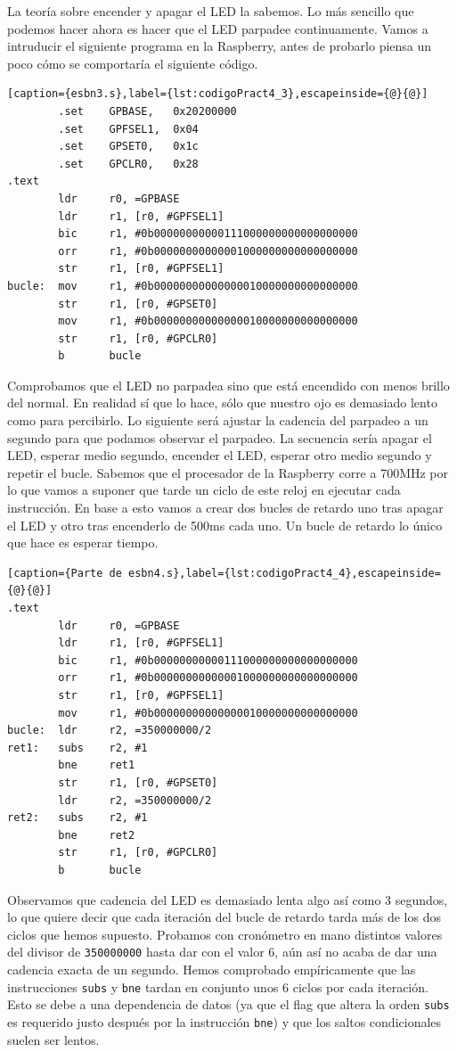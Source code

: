 La teoría sobre encender y apagar el LED la sabemos. Lo más sencillo que podemos hacer ahora
es hacer que el LED parpadee continuamente. Vamos a intruducir el siguiente programa en la
Raspberry, antes de probarlo piensa un poco cómo se comportaría el siguiente código.

\begin{lstlisting}[caption={esbn3.s},label={lst:codigoPract4_3},escapeinside={@}{@}]
        .set    GPBASE,   0x20200000
        .set    GPFSEL1,  0x04
        .set    GPSET0,   0x1c
        .set    GPCLR0,   0x28
.text
        ldr     r0, =GPBASE
        ldr     r1, [r0, #GPFSEL1]
        bic     r1, #0b00000000000111000000000000000000
        orr     r1, #0b00000000000001000000000000000000
        str     r1, [r0, #GPFSEL1]
bucle:  mov     r1, #0b00000000000000010000000000000000
        str     r1, [r0, #GPSET0]
        mov     r1, #0b00000000000000010000000000000000
        str     r1, [r0, #GPCLR0]
        b       bucle
\end{lstlisting}

Comprobamos que el LED no parpadea sino que está encendido con menos brillo del normal.
En realidad sí que lo hace, sólo que nuestro ojo es demasiado lento como para percibirlo.
Lo siguiente será ajustar la cadencia del parpadeo a un segundo para que podamos observar
el parpadeo. La secuencia sería apagar el LED, esperar medio segundo, encender el LED,
esperar otro medio segundo y repetir el bucle. Sabemos que el procesador de la Raspberry
corre a 700MHz por lo que vamos a suponer que tarde un ciclo de este reloj en ejecutar
cada instrucción. En base a esto vamos a crear dos bucles de retardo uno tras apagar el LED
y otro tras encenderlo de 500ms cada uno. Un bucle de retardo lo único que hace es esperar
tiempo. 

\begin{lstlisting}[caption={Parte de esbn4.s},label={lst:codigoPract4_4},escapeinside={@}{@}]
.text
        ldr     r0, =GPBASE
        ldr     r1, [r0, #GPFSEL1]
        bic     r1, #0b00000000000111000000000000000000
        orr     r1, #0b00000000000001000000000000000000
        str     r1, [r0, #GPFSEL1]
        mov     r1, #0b00000000000000010000000000000000
bucle:  ldr     r2, =350000000/2
ret1:   subs    r2, #1
        bne     ret1
        str     r1, [r0, #GPSET0]
        ldr     r2, =350000000/2
ret2:   subs    r2, #1
        bne     ret2
        str     r1, [r0, #GPCLR0]
        b       bucle
\end{lstlisting}

Observamos que cadencia del LED es demasiado lenta algo así como 3 segundos, lo que quiere
decir que cada iteración del bucle de retardo tarda más de los dos ciclos que hemos supuesto.
Probamos con cronómetro en mano distintos valores del divisor de {\tt 350000000} hasta dar con
el valor 6, aún así no acaba de dar una cadencia exacta de un segundo. Hemos comprobado
empíricamente que las instrucciones {\tt subs} y {\tt bne} tardan en conjunto unos 6 ciclos
por cada iteración. Esto se debe a una dependencia de datos (ya que el flag que altera
la orden {\tt subs} es requerido justo después por la instrucción {\tt bne}) y que los saltos
condicionales suelen ser lentos.

